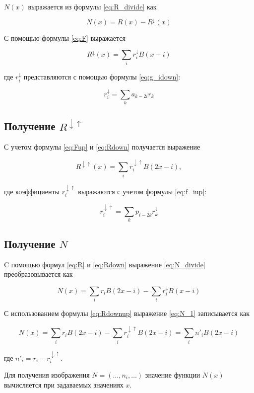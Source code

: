$N(x)$ выражается из формулы \ref{eq:R_divide} как

\begin{equation}\label{eq:N_divide}
	N(x)=R(x)-R^{\downarrow}(x)
\end{equation}

С помощью формулы \ref{eq:F} выражается

\begin{equation}\label{eq:Rdown}
	R^{\downarrow}(x)=\sum_{i}r_{i}^{\downarrow}B(x-i)
\end{equation}

где $r_{i}^{\downarrow}$ представляются с помощью формулы \ref{eq:g_idown}:

\begin{equation}\label{eq:r_idown}
	r_i^{\downarrow}=\sum_{k}a_{k-2i}r_k
\end{equation}

\subsection{Получение $R^{\downarrow\uparrow}$}

С учетом формулы \ref{eq:Fup} и \ref{eq:Rdown} получается выражение

\begin{equation}\label{eq:Rdownup}
	R^{\downarrow\uparrow}(x)=\sum_{i}r_{i}^{\downarrow\uparrow}B(2x-i),
\end{equation}

где коэффициенты $r_{i}^{\downarrow\uparrow}$ выражаются с учетом формулы \ref{eq:f_iup}:

\begin{equation}\label{eq:r_idownup}
	r_i^{\downarrow\uparrow}=\sum_{k}p_{i-2k}r_k^{\downarrow}
\end{equation}

\subsection{Получение $N$}

C помощью формул \ref{eq:R} и \ref{eq:Rdown} выражение \ref{eq:N_divide} преобразовывается как

\begin{equation}\label{eq:N_1}
	N(x)=\sum_{i}r_{i}B(2x-i)-\sum_{i}r_{i}^{\downarrow}B(x-i)
\end{equation}

С использованием формулы \ref{eq:Rdownup} выражение \ref{eq:N_1} записывается как

\begin{equation}\label{eq:N}
	N(x)=\sum_{i}r_{i}B(2x-i)-\sum_{i}r_{i}^{\downarrow\uparrow}B(2x-i)=\sum_{i}n'_{i}B(2x-i)
\end{equation}

где $n'_i=r_i-r_i^{\downarrow\uparrow}$.

Для получения изображения $N=(\dots,n_i,\dots)$ значение функции $N(x)$ вычисляется при задаваемых значениях $x$.